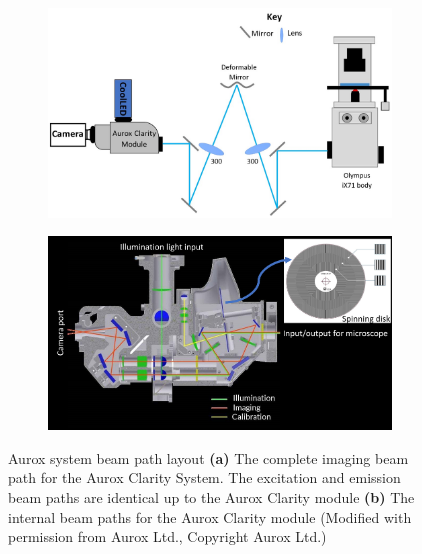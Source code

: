 \begin{figure}[h]
	\begin{subfigure}{0.48\textwidth}
		\centering
		\includegraphics[width=\linewidth]{images/Aurox_beam_path.jpg}
		\caption{}
		\label{fig:aurox_beam_path}
	\end{subfigure}
	\begin{subfigure}{0.48\textwidth}
		\centering
		\includegraphics[width=\linewidth]{images/aurox_clarity_internal.png}
		\caption{}
		\label{fig:aurox_clarity_internal}
	\end{subfigure}
	\caption[Aurox system beam path layout]{Aurox system beam path layout \textbf{(a)} The complete imaging beam path for the Aurox Clarity System. The excitation and emission beam paths are identical up to the Aurox Clarity module \textbf{(b)} The internal beam paths for the Aurox Clarity module (Modified with permission from Aurox Ltd., Copyright Aurox Ltd.)}
	\label{fig:aurox_system}
\end{figure}

